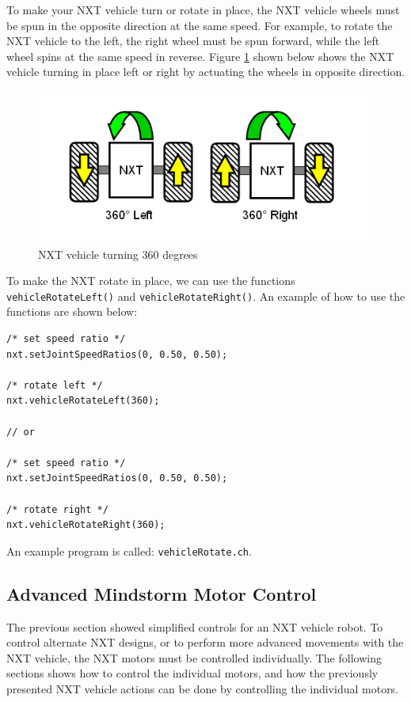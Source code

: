 \documentclass[11pt]{article}
\begin{document}
To make your NXT vehicle turn or rotate in place, the NXT vehicle wheels must 
be spun in the opposite direction at the same speed. For example, to rotate the 
NXT vehicle to the left, the right wheel must be spun forward, while the left 
wheel spins at the same speed in reverse. Figure \ref{fig_NXT_360LR} shown below 
shows the NXT vehicle turning in place left or right by actuating the wheels in 
opposite direction.
\begin{figure}[H]
  \begin{center}
    \includegraphics[height=2in]{figure/mindstorm/Vehicle_360LR.png}
    \caption{NXT vehicle turning 360 degrees \label{fig_NXT_360LR}}
  \end{center}
\end{figure}
To make the NXT rotate in place, we can use the functions {\tt vehicleRotateLeft()} 
and {\tt vehicleRota}{\tt teRight()}. An example of how to use the functions are shown 
below:
\begin{lstlisting}
/* set speed ratio */
nxt.setJointSpeedRatios(0, 0.50, 0.50);
    
/* rotate left */
nxt.vehicleRotateLeft(360);

// or
    
/* set speed ratio */
nxt.setJointSpeedRatios(0, 0.50, 0.50);

/* rotate right */
nxt.vehicleRotateRight(360);
\end{lstlisting}
An example program is called: {\tt vehicleRotate.ch}.

\subsection{Advanced Mindstorm Motor Control}
The previous section showed simplified controls for an NXT vehicle robot. To 
control alternate NXT designs, or to perform more advanced movements with the 
NXT vehicle, the NXT motors must be controlled individually. The following 
sections shows how to control the individual motors, and how the previously 
presented NXT vehicle actions can be done by controlling the individual motors.
\end{document}
